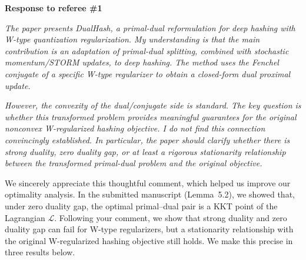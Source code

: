 \documentclass[11pt]{article}
\newcommand{\calL}{\mathcal{L}}
\newcommand{\newred}[1]{{\color{red}#1}}
\newenvironment{qalist}{\begin{description}[leftmargin=0pt,labelindent=0pt,itemsep=0.8em,parsep=0.5em,font=\normalfont\upshape\bfseries]}{\end{description}}
\begin{document}
\clearpage
\begin{center}
{\Large\bfseries Response to referee \#1\par}
\end{center}

\medskip
{\itshape The paper presents DualHash, a primal-dual reformulation for deep hashing with W-type quantization regularization. My understanding is that the main contribution is an adaptation of primal-dual splitting, combined with stochastic momentum/STORM updates, to deep hashing. The method uses the Fenchel conjugate of a specific W-type regularizer to obtain a closed-form dual proximal update.}

\medskip
{}
\begin{qalist}
\item[{Q1.}] {\itshape However, the convexity of the dual/conjugate side is standard. The key question is whether this transformed problem provides meaningful guarantees for the original nonconvex W-regularized hashing objective. I do not find this connection convincingly established. In particular, the paper should clarify whether there is strong duality, zero duality gap, or at least a rigorous stationarity relationship between the transformed primal-dual problem and the original objective.}
\item[Response:]
We sincerely appreciate this thoughtful comment, which helped us improve our optimality analysis. \newred{In the submitted manuscript (Lemma~5.2), we showed} that, under zero duality gap, the optimal primal--dual pair is a KKT point of the Lagrangian $\calL$. Following \newred{your} comment, \newred{we show that strong duality and zero duality gap can fail for W-type regularizers, but a stationarity relationship with the original W-regularized hashing objective still holds. We make this precise in three results below.}


\end{qalist}
\end{document}

